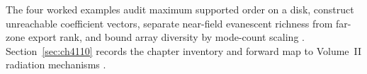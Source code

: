 
The four worked examples audit maximum supported order on a disk, construct unreachable coefficient vectors, separate near-field evanescent richness from
far-zone export rank, and bound array diversity by mode-count scaling \cite{stratton1941,harrington2001,hansen1988,devaney2004,jackson1999,collin2001}.
Section~\ref{sec:ch4110} records the chapter inventory and forward map to Volume~II radiation mechanisms \cite{harrington2001,devaney2004}.
